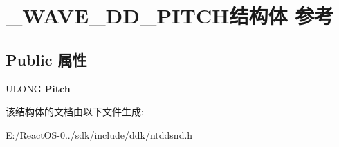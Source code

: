 \hypertarget{struct___w_a_v_e___d_d___p_i_t_c_h}{}\section{\+\_\+\+W\+A\+V\+E\+\_\+\+D\+D\+\_\+\+P\+I\+T\+C\+H结构体 参考}
\label{struct___w_a_v_e___d_d___p_i_t_c_h}
\subsection*{Public 属性}
\begin{DoxyCompactItemize}
\item 
\mbox{\label{struct___w_a_v_e___d_d___p_i_t_c_h_a5a9af59e9d35f284f6927e6ca5b8a11e}} 
U\+L\+O\+NG {\bfseries Pitch}
\end{DoxyCompactItemize}


该结构体的文档由以下文件生成\+:\begin{DoxyCompactItemize}
\item 
E\+:/\+React\+O\+S-\/0../sdk/include/ddk/ntddsnd.\+h\end{DoxyCompactItemize}

